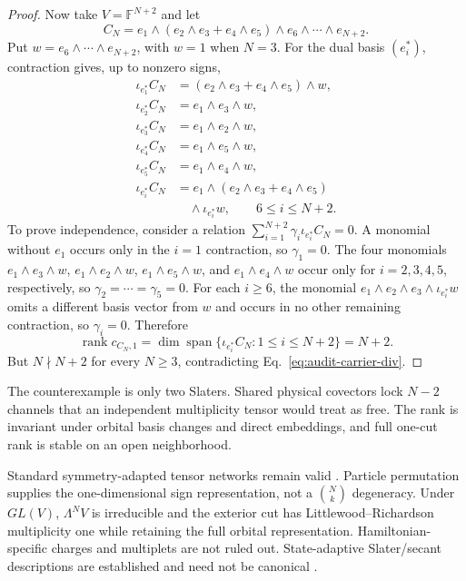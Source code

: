 \documentclass[aps,pra,reprint,superscriptaddress,nofootinbib,longbibliography,showkeys]{revtex4-2}
\theoremstyle{definition}
\newcommand{\rank}{\operatorname{rank}}
\begin{document}
\begin{proof}
Now take $V=\mathbb F^{N+2}$ and let
\[
 C_N=e_1\wedge(e_2\wedge e_3+e_4\wedge e_5)
 \wedge e_6\wedge\cdots\wedge e_{N+2}.
\]
Put $w=e_6\wedge\cdots\wedge e_{N+2}$, with $w=1$ when $N=3$.  For the dual
basis $(e_i^*)$, contraction gives, up to nonzero signs,
\begin{align}
\iota_{e_1^*}C_N&=(e_2\wedge e_3+e_4\wedge e_5)\wedge w,\nonumber\\
\iota_{e_2^*}C_N&=e_1\wedge e_3\wedge w,\nonumber\\
\iota_{e_3^*}C_N&=e_1\wedge e_2\wedge w,\nonumber\\
\iota_{e_4^*}C_N&=e_1\wedge e_5\wedge w,\nonumber\\
\iota_{e_5^*}C_N&=e_1\wedge e_4\wedge w,\nonumber\\
\iota_{e_i^*}C_N
&=e_1\wedge(e_2\wedge e_3+e_4\wedge e_5)\nonumber\\[-2pt]
&\quad\wedge\iota_{e_i^*}w,\qquad 6\le i\le N+2.
\end{align}
To prove independence, consider a relation
$\sum_{i=1}^{N+2}\gamma_i\iota_{e_i^*}C_N=0$.  A monomial without $e_1$
occurs only in the $i=1$ contraction, so $\gamma_1=0$.  The four monomials
$e_1\wedge e_3\wedge w$, $e_1\wedge e_2\wedge w$,
$e_1\wedge e_5\wedge w$, and $e_1\wedge e_4\wedge w$ occur only for
$i=2,3,4,5$, respectively, so $\gamma_2=\cdots=\gamma_5=0$.  For each
$i\ge6$, the monomial
$e_1\wedge e_2\wedge e_3\wedge\iota_{e_i^*}w$ omits a different basis vector
from $w$ and occurs in no other remaining contraction, so $\gamma_i=0$.
Therefore
\begin{equation}
\rank c_{C_N,1}=\dim\operatorname{span}
\{\iota_{e_i^*}C_N:1\le i\le N+2\}=N+2.
\end{equation}
But $N\nmid N+2$ for every $N\ge3$, contradicting
Eq.~\eqref{eq:audit-carrier-div}.
\end{proof}

The counterexample is only two Slaters.  Shared physical covectors lock
$N-2$ channels that an independent multiplicity tensor would treat as free.
The rank is invariant under orbital basis changes and direct embeddings, and
full one-cut rank is stable on an open neighborhood.

Standard symmetry-adapted tensor networks remain valid
\cite{SinghPfeiferVidal2010SymmetryTN,Weichselbaum2012NonAbelianTN}.
Particle permutation supplies the one-dimensional sign representation, not a
$\binom{N}{k}$ degeneracy.  Under $GL(V)$, $\Lambda^N V$ is irreducible and the
exterior cut has Littlewood--Richardson multiplicity one while retaining the
full orbital representation.  Hamiltonian-specific charges and multiplets are
not ruled out.  State-adaptive Slater/secant descriptions are established and
need not be canonical \cite{SchliemannCiracKusEtAl2001SlaterRank,
BallicoBernardiCatalisanoChiantini2013GrassmannSecants,
GalganoStaffolani2024GrassmannianIdentifiability}.
\end{document}
